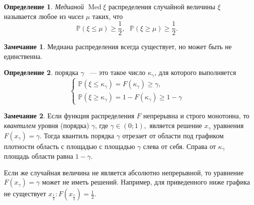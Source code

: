 \documentclass[oneside,final,14pt]{extreport}
\newcommand\myprob[1]{{\mathbb{P}(#1)}}
\theoremstyle{plain}
\theoremstyle{definition}
\newtheorem*{defn}{Определение}
\newtheorem*{rmrk}{Замечание}
\theoremstyle{named}
\begin{document}
\begin{defn}
    {\it Медианой} $\operatorname{Med} \xi$ распределения случайной величины $\xi$ называется любое из {\it чисел} $\mu$ таких, что
    \begin{equation*}
        \myprob{\xi \leqslant \mu} \geqslant \frac{1}{2}, ~~~ \myprob{\xi \geqslant \mu} \geqslant \frac{1}{2}.
    \end{equation*}
\end{defn} 

\begin{rmrk}
    Медиана распределения всегда существует, но может быть не единственна.
\end{rmrk} 

\begin{defn}
{  порядка $\gamma$} ~--- это такое число $\kappa_\gamma$, для которого выполняется 
$$ \begin{cases} \myprob{\xi \leqslant \kappa_\gamma} = F(\kappa_\gamma) \geqslant \gamma, \\
\myprob{\xi \geqslant \kappa_\gamma} = 1 - F(\kappa_\gamma) \geqslant 1 - \gamma \end{cases}
$$
\end{defn}

\begin{rmrk}
    Если функция распределения $F$ непрерывна и строго монотонна, то {\it квантилем} уровня (порядка) $\gamma$, где $\gamma \in (0; 1), $ является решение $x_\gamma$ уравнения $F(x_\gamma) = \gamma.$ 
    Тогда квантиль порядка $\gamma$ отрезает от области под графиком плотности область с площадью с площадью $\gamma$ слева от себя. Справа от $\kappa_\gamma$ площадь области равна $1 - \gamma$.
    
    Если же случайная величина не является абсолютно непрерывной, то уравнение $F(x_\gamma) = \gamma$ может не иметь решений. Например, для приведенного ниже графика не существует $x_{\frac{1}{2}}: F(x_{\frac{1}{2}}) = \frac{1}{2}$.
        
    \medskip\hfill\break
    \begin{center}
    \end{center}
\end{rmrk} 
\end{document}
